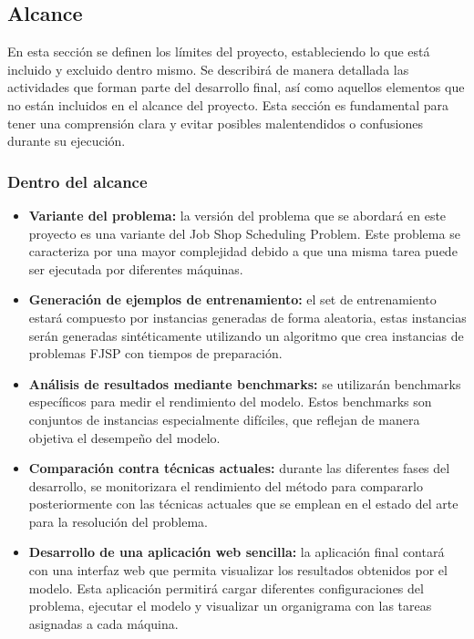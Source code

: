 \subsection{Alcance}
En esta sección se definen los límites del proyecto, estableciendo lo que está
incluido y excluido dentro mismo. Se describirá de manera detallada las
actividades que forman parte del desarrollo final, así como aquellos elementos
que no están incluidos en el alcance del proyecto. Esta sección es fundamental
para tener una comprensión clara y evitar posibles malentendidos o confusiones
durante su ejecución.

\subsubsection{Dentro del alcance}
\begin{itemize}
    \item \textbf{Variante del problema:} la versión del problema que se abordará en este proyecto
          es una variante del Job Shop Scheduling Problem. Este problema se caracteriza por una mayor
          complejidad debido a que una misma tarea puede ser ejecutada por diferentes máquinas.
    \item \textbf{Generación de ejemplos de entrenamiento:} el set de entrenamiento estará compuesto
          por instancias generadas de forma aleatoria, estas instancias serán generadas sintéticamente
          utilizando un algoritmo que crea instancias de problemas FJSP con tiempos de preparación.
    \item \textbf{Análisis de resultados mediante benchmarks:} se utilizarán benchmarks
          específicos para medir el rendimiento del modelo. Estos benchmarks son conjuntos de instancias
          especialmente difíciles, que reflejan de manera objetiva el desempeño del modelo.
    \item \textbf{Comparación contra técnicas actuales:} durante las diferentes fases del desarrollo,
          se monitorizara el rendimiento del método para compararlo posteriormente con las técnicas actuales
          que se emplean en el estado del arte para la resolución del problema.
    \item \textbf{Desarrollo de una aplicación web sencilla:} la aplicación final contará con una interfaz
          web que permita visualizar los resultados obtenidos por el modelo. Esta aplicación
          permitirá cargar diferentes configuraciones del problema, ejecutar el modelo y visualizar
          un organigrama con las tareas asignadas a cada máquina.
\end{itemize}

